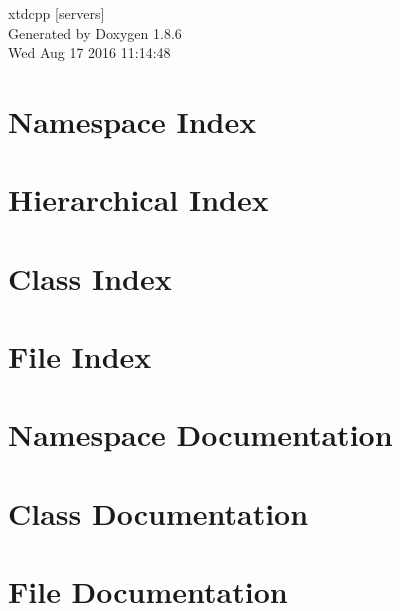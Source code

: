 \documentclass[twoside]{book}
\newcommand{\clearemptydoublepage}{%
  \newpage{\pagestyle{empty}\cleardoublepage}%
}
\begin{document}
\hypersetup{pageanchor=false}
\begin{titlepage}
\vspace*{7cm}
\begin{center}%
{\Large xtdcpp \mbox{[}servers\mbox{]} }\\
\vspace*{1cm}
{\large Generated by Doxygen 1.8.6}\\
\vspace*{0.5cm}
{\small Wed Aug 17 2016 11:14:48}\\
\end{center}
\end{titlepage}
\clearemptydoublepage
\tableofcontents
\clearemptydoublepage
{}
\hypersetup{pageanchor=true}

\chapter{Namespace Index}

\chapter{Hierarchical Index}

\chapter{Class Index}

\chapter{File Index}

\chapter{Namespace Documentation}




\chapter{Class Documentation}










\chapter{File Documentation}













\newpage
{}
{}
\printindex
\end{document}
